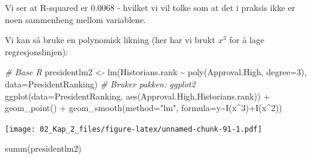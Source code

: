 \documentclass[
]{article}
\newenvironment{Shaded}{\begin{snugshade}}{\end{snugshade}}
\newcommand{\AttributeTok}[1]{\textcolor[rgb]{0.77,0.63,0.00}{#1}}
\newcommand{\CommentTok}[1]{\textcolor[rgb]{0.56,0.35,0.01}{\textit{#1}}}
\newcommand{\DecValTok}[1]{\textcolor[rgb]{0.00,0.00,0.81}{#1}}
\newcommand{\FunctionTok}[1]{\textcolor[rgb]{0.00,0.00,0.00}{#1}}
\newcommand{\NormalTok}[1]{#1}
\newcommand{\OtherTok}[1]{\textcolor[rgb]{0.56,0.35,0.01}{#1}}
\newcommand{\SpecialCharTok}[1]{\textcolor[rgb]{0.00,0.00,0.00}{#1}}
\newcommand{\StringTok}[1]{\textcolor[rgb]{0.31,0.60,0.02}{#1}}
\begin{document}
Vi ser at R-squared er \(0.0068\) - hvilket vi vil tolke som at det i praksis ikke er noen sammenheng mellom variablene.

Vi kan så bruke en polynomisk likning (her har vi brukt \(x^3\) for å lage regresjonslinjen):

\begin{Shaded}
\begin{Highlighting}[]
\CommentTok{\# Base R}
\NormalTok{presidentlm2 }\OtherTok{\textless{}{-}} \FunctionTok{lm}\NormalTok{(Historians.rank }\SpecialCharTok{\textasciitilde{}} \FunctionTok{poly}\NormalTok{(Approval.High, }\AttributeTok{degree=}\DecValTok{3}\NormalTok{), }\AttributeTok{data=}\NormalTok{PresidentRanking)}
\CommentTok{\# Bruker pakken: ggplot2}
\FunctionTok{ggplot}\NormalTok{(}\AttributeTok{data=}\NormalTok{PresidentRanking, }\FunctionTok{aes}\NormalTok{(Approval.High,Historians.rank)) }\SpecialCharTok{+}
    \FunctionTok{geom\_point}\NormalTok{() }\SpecialCharTok{+} 
    \FunctionTok{geom\_smooth}\NormalTok{(}\AttributeTok{method=}\StringTok{"lm"}\NormalTok{, }\AttributeTok{formula=}\NormalTok{y}\SpecialCharTok{\textasciitilde{}}\FunctionTok{I}\NormalTok{(x}\SpecialCharTok{\^{}}\DecValTok{3}\NormalTok{)}\SpecialCharTok{+}\FunctionTok{I}\NormalTok{(x}\SpecialCharTok{\^{}}\DecValTok{2}\NormalTok{))}
\end{Highlighting}
\end{Shaded}

\texttt{[image: 02\_Kap\_2\_files/figure-latex/unnamed-chunk-91-1.pdf]}

\begin{Shaded}
\begin{Highlighting}[]
\FunctionTok{summ}\NormalTok{(presidentlm2)}
\end{Highlighting}
\end{Shaded}
\end{document}

